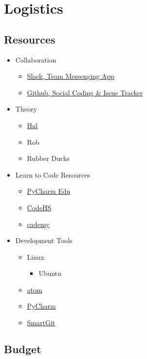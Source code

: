 \documentclass[11pt]{article}
\begin{document}
\section{{\color{blue}Logistics}}

\subsection{{\color{blue}Resources}}

\begin{itemize}
	\item Collaboration
		\begin{itemize}
			\item \href{https://slack.com/}{Slack, Team Messenging App}
			\item \href{https://github.com/}{Github, Social Coding \& Issue Tracker}
		\end{itemize}
	\item Theory
		\begin{itemize}
			\item \href{http://baxter-academy.org/faculty#hlarsson}{Hal}
			\item Rob
			\item Rubber Ducks
		\end{itemize}
	\item Learn to Code Resources
		\begin{itemize}
			\item \href{https://www.jetbrains.com/pycharm-edu/}{PyCharm Edu}
			\item \href{https://codehs.com/}{CodeHS}
			\item \href{http://www.codecademy.com/}{\underline{c}ademy}
		\end{itemize}
	\item Development Tools
		\begin{itemize}
			\item Linux
				\begin{itemize}
					\item Ubuntu
				\end{itemize}
			\item \href{https://atom.io/}{atom}
			\item \href{https://www.jetbrains.com/pycharm/}{PyCharm}
			\item \href{http://www.syntevo.com/smartgit/}{SmartGit}
		\end{itemize}
\end{itemize}

\subsection{{\color{blue}Budget}}
\end{document}
